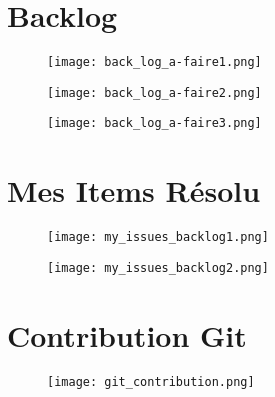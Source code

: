 \begin{appendices}
\section{Backlog}\label{appen:backlog}

\begin{figure}[!ht]
\centering
\texttt{[image: back\_log\_a-faire1.png]}
\end{figure}

\begin{figure}[!ht]
\centering
\texttt{[image: back\_log\_a-faire2.png]}
\end{figure}

\begin{figure}[!ht]
\centering
\texttt{[image: back\_log\_a-faire3.png]}
\end{figure}


\newpage
\section{Mes Items Résolu}\label{appen:my_backlog}
\begin{figure}[!ht]
\centering
\texttt{[image: my\_issues\_backlog1.png]}
\end{figure}

\begin{figure}[!ht]
\centering
\texttt{[image: my\_issues\_backlog2.png]}
\end{figure}

\newpage
\section{Contribution Git}\label{appen:git_contribution}
\begin{figure}[!ht]
\centering
\texttt{[image: git\_contribution.png]}
\end{figure}

\end{appendices}
